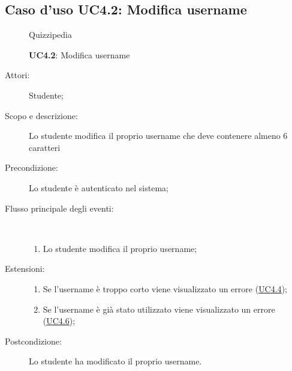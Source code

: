 \subsection{Caso d'uso UC4.2: Modifica username}
	\begin{figure}[H]
		\centering
		\begin{resizedtikzpicture}{\textwidth}
		\begin{umlsystem}[x=0, fill=lightgray!20]{Quizzipedia}
		\end{umlsystem}
		\end{resizedtikzpicture}
		\caption{\textbf{UC4.2}: Modifica username}
		\label{UC4.2}
	\end{figure}
\begin{description}
\item[Attori:] Studente;
\item[Scopo e descrizione:] Lo studente modifica il proprio username che deve contenere almeno 6 caratteri
      \item[Precondizione:] Lo studente è autenticato nel sistema;

        \item[Flusso principale degli eventi:] \ 
 \begin{enumerate}
          \item Lo studente modifica il proprio username;

      \end{enumerate}
    \item[Estensioni:]
      \begin{enumerate}
          \item Se l'username è troppo corto viene visualizzato un errore (\hyperlink{UC4.4}{UC4.4});
          \item Se l'username è già stato utilizzato viene visualizzato un errore (\hyperlink{UC4.6}{UC4.6});

      \end{enumerate}
    \item[Postcondizione:] Lo studente ha modificato il proprio username.
  \end{description}
\hypertarget{UC4.3}{}
